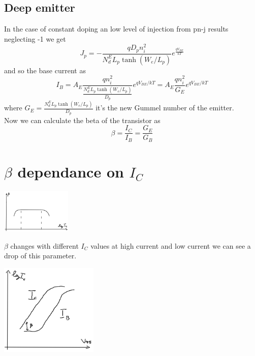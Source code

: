 \subsection{Deep emitter}
In the case of constant doping an low level of injection from pn-j results neglecting -1 we get
\begin{equation}
J_p=-{\frac{qD_pn_i^2}{N_d^EL_p\tanh(W_e/L_p)}e^{\frac{qV_{BE}}{kT}}}
\end{equation}
and so the base current as
\begin{equation}
I_B=A_E \frac{qn_i^2}{\frac{N_d^E L_p \tanh(W_e/L_p)}{D_p}}e^{qV_{BE}/kT}=A_E \frac{qn_i^2}{G_E}e^{qV_{BE}/kT}
\end{equation}
where $G_E=\frac{N_d^EL_p \tanh(W_e/L_p)}{D_p}$ it's the new Gummel number of the emitter. \\
Now we can calculate the beta of the transistor as
\begin{equation}
\beta=\frac{I_C}{I_B}=\frac{G_E}{G_B}
\end{equation}

\section{$\beta$ dependance on $I_C$}

\centering
\includegraphics[width=0.25\textwidth]{bjt7.png}\\
\raggedright

$\beta$ changes with different $I_C$ values at high current and low current we can see a drop of this parameter.

\centering
\includegraphics[width=0.35\textwidth]{bjt8.png}\\
\raggedright

